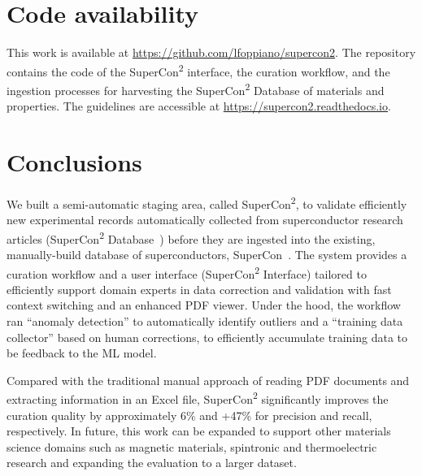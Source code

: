 \documentclass[]{interact}
\theoremstyle{plain} %
\theoremstyle{definition}
\theoremstyle{remark}
\begin{document}
\section{Code availability}
This work is available at \url{https://github.com/lfoppiano/supercon2}. The repository contains the code of the SuperCon\textsuperscript{2} interface, the curation workflow, and the ingestion processes for harvesting the SuperCon\textsuperscript{2} Database of materials and properties. The guidelines are accessible at \url{https://supercon2.readthedocs.io}.

\section{Conclusions}
We built a semi-automatic staging area, called SuperCon\textsuperscript{2}, to validate efficiently new experimental records automatically collected from superconductor research articles (SuperCon\textsuperscript{2} Database~\cite{lfoppiano2023automatic}) before they are ingested into the existing, manually-build database of superconductors, SuperCon~\cite{ishii2023structuring}.
The system provides a curation workflow and a user interface (SuperCon\textsuperscript{2} Interface) tailored to efficiently support domain experts in data correction and validation with fast context switching and an enhanced PDF viewer.
Under the hood, the workflow ran ``anomaly detection'' to automatically identify outliers and a ``training data collector'' based on human corrections, to efficiently accumulate training data to be feedback to the ML model. 

Compared with the traditional manual approach of reading PDF documents and extracting information in an Excel file, SuperCon\textsuperscript{2} significantly improves the curation quality by approximately 6\% and +47\% for precision and recall, respectively.
In future, this work can be expanded to support other materials science domains such as magnetic materials, spintronic and thermoelectric research and expanding the evaluation to a larger dataset. 


\end{document}
